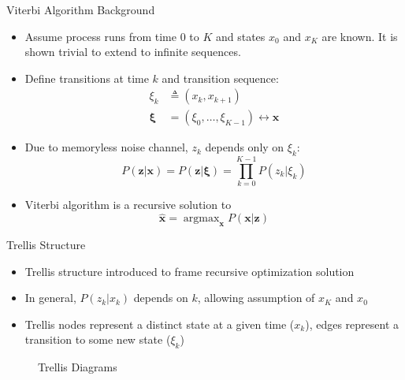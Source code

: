 \documentclass[xetex,mathserif,serif]{beamer}
\DeclareMathOperator*{\argmax}{argmax}
\begin{document}
\begin{frame}{Viterbi Algorithm Background}
    \begin{itemize}
    \item Assume process runs from time 0 to $K$ and states $x_0$ and $x_K$ are
          known. It is shown trivial to extend to infinite sequences.
    \item Define transitions at time $k$ and transition sequence:
    \begin{equation}
    \begin{aligned}
    \xi_k &\triangleq (x_k, x_{k+1})\\
    \boldsymbol \xi &= (\xi_0, \ldots, \xi_{K-1}) \leftrightarrow \mathbf x
    \end{aligned}
    \end{equation}
    \item Due to memoryless noise channel, $z_k$ depends only on $\xi_k$:
    \begin{equation}
        P(\mathbf z | \mathbf x) = P(\mathbf z | \boldsymbol \xi) =
        \prod_{k=0}^{K-1} P(z_k | \xi_k)
    \end{equation}
    \item Viterbi algorithm is a recursive solution to
    \begin{equation}
        \mathbf{\hat x} = \argmax_{\mathbf x} P(\mathbf x | \mathbf z)
    \end{equation}
    \end{itemize}
\end{frame}

\begin{frame}{Trellis Structure}
    \begin{itemize}
    \item Trellis structure introduced to frame recursive optimization solution
    \item In general, $P(z_k | x_k)$ depends on $k$, allowing assumption of
          $x_K$ and $x_0$
    \item Trellis nodes represent a distinct state at a given time ($x_k$),
          edges represent a transition to some new state ($\xi_k$)
    \end{itemize}
    \begin{figure}
        
        \caption{Trellis Diagrams}
    \end{figure}
\end{frame}
\end{document}
